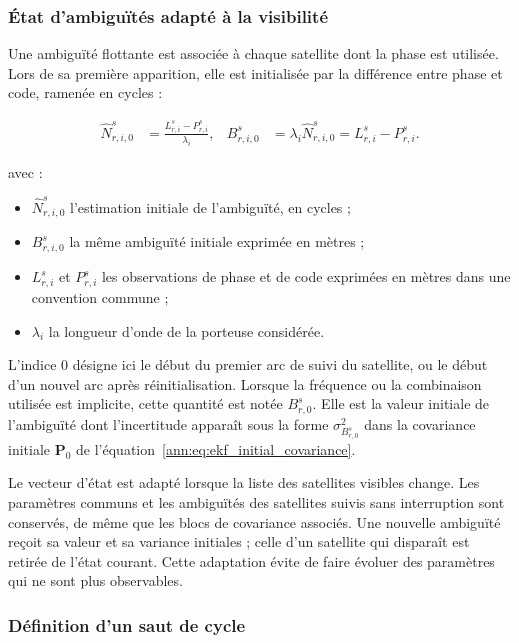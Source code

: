 \subsubsection{État d'ambiguïtés adapté à la visibilité}

Une ambiguïté flottante est associée à chaque satellite dont la phase est
utilisée. Lors de sa première apparition, elle est initialisée par la
différence entre phase et code, ramenée en cycles :

\begin{align}
\widehat N_{r,i,0}^s
&=
\frac{L_{r,i}^s-P_{r,i}^s}{\lambda_i},
&
B_{r,i,0}^s
&=
\lambda_i\widehat N_{r,i,0}^s
=L_{r,i}^s-P_{r,i}^s.
\label{ann:eq:ambiguity_initialization}
\end{align}

avec :

\begin{itemize}
    \item $\widehat N_{r,i,0}^s$ l'estimation initiale de l'ambiguïté, en
    cycles ;
    \item $B_{r,i,0}^s$ la même ambiguïté initiale exprimée en mètres ;
    \item $L_{r,i}^s$ et $P_{r,i}^s$ les observations de phase et de code
    exprimées en mètres dans une convention commune ;
    \item $\lambda_i$ la longueur d'onde de la porteuse considérée.
\end{itemize}

L'indice $0$ désigne ici le début du premier arc de suivi du satellite, ou le
début d'un nouvel arc après réinitialisation. Lorsque la fréquence ou la
combinaison utilisée est implicite, cette quantité est notée $B_{r,0}^s$. Elle
est la valeur initiale de l'ambiguïté dont l'incertitude apparaît sous la forme
$\sigma_{B_{r,0}^s}^2$ dans la covariance initiale $\mathbf P_0$ de
l'équation~\eqref{ann:eq:ekf_initial_covariance}.

Le vecteur d'état est adapté lorsque la liste des satellites visibles change.
Les paramètres communs et les ambiguïtés des satellites suivis sans
interruption sont conservés, de même que les blocs de covariance associés. Une
nouvelle ambiguïté reçoit sa valeur et sa variance initiales ; celle d'un
satellite qui disparaît est retirée de l'état courant. Cette adaptation évite
de faire évoluer des paramètres qui ne sont plus observables.

\subsubsection{Définition d'un saut de cycle}

